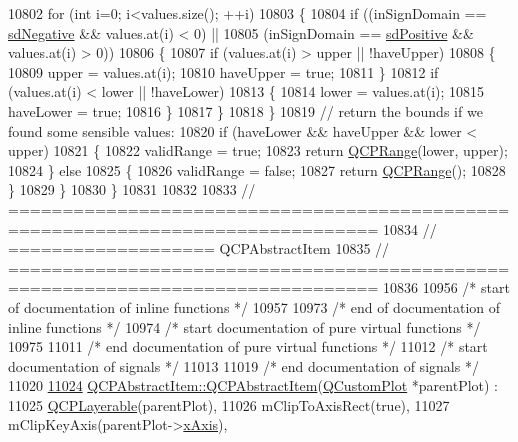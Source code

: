 \begin{DoxyCode}
10802     \textcolor{keywordflow}{for} (\textcolor{keywordtype}{int} i=0; i<values.size(); ++i)
10803     \{
10804       \textcolor{keywordflow}{if} ((inSignDomain == \hyperlink{a00024_a661743478a1d3c09d28ec2711d7653d8a0fc9a70796ef60ad18ddd18056e6dc63}{sdNegative} && values.at(i) < 0) ||
10805           (inSignDomain == \hyperlink{a00024_a661743478a1d3c09d28ec2711d7653d8a02951859f243a4d24e779cfbb5471030}{sdPositive} && values.at(i) > 0))
10806       \{
10807         \textcolor{keywordflow}{if} (values.at(i) > upper || !haveUpper)
10808         \{
10809           upper = values.at(i);
10810           haveUpper = \textcolor{keyword}{true};
10811         \}
10812         \textcolor{keywordflow}{if} (values.at(i) < lower || !haveLower)
10813         \{
10814           lower = values.at(i);
10815           haveLower = \textcolor{keyword}{true};
10816         \}
10817       \}
10818     \}
10819     \textcolor{comment}{// return the bounds if we found some sensible values:}
10820     \textcolor{keywordflow}{if} (haveLower && haveUpper && lower < upper)
10821     \{
10822       validRange = \textcolor{keyword}{true};
10823       \textcolor{keywordflow}{return} \hyperlink{a00049}{QCPRange}(lower, upper);
10824     \} \textcolor{keywordflow}{else}
10825     \{
10826       validRange = \textcolor{keyword}{false};
10827       \textcolor{keywordflow}{return} \hyperlink{a00049}{QCPRange}();
10828     \}
10829   \}
10830 \}
10831 
10832 
10833 \textcolor{comment}{// ================================================================================}
10834 \textcolor{comment}{// =================== QCPAbstractItem}
10835 \textcolor{comment}{// ================================================================================}
10836 
10956 \textcolor{comment}{/* start of documentation of inline functions */}
10957 
10973 \textcolor{comment}{/* end of documentation of inline functions */}
10974 \textcolor{comment}{/* start documentation of pure virtual functions */}
10975 
11011 \textcolor{comment}{/* end documentation of pure virtual functions */}
11012 \textcolor{comment}{/* start documentation of signals */}
11013 
11019 \textcolor{comment}{/* end documentation of signals */}
11020 
\hypertarget{a00115_source_l11024}{}\hyperlink{a00022_a9922507d8b4503a1fe1ed0b1030e23b6}{11024} \hyperlink{a00022_a9922507d8b4503a1fe1ed0b1030e23b6}{QCPAbstractItem::QCPAbstractItem}(\hyperlink{a00030_d8/d00/a00186}{QCustomPlot} *parentPlot) :
11025   \hyperlink{a00044}{QCPLayerable}(parentPlot),
11026   mClipToAxisRect(true),
11027   mClipKeyAxis(parentPlot->\hyperlink{a00116_a384438707adbcc96b0fa1324106f7129}{xAxis}),

\end{DoxyCode}
